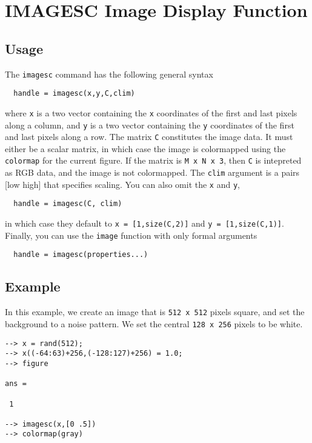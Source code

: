 \section{IMAGESC Image Display Function}

\subsection{Usage}

The \verb|imagesc| command has the following general syntax
\begin{verbatim}
  handle = imagesc(x,y,C,clim)
\end{verbatim}
where \verb|x| is a two vector containing the \verb|x| coordinates
of the first and last pixels along a column, and \verb|y| is a
two vector containing the \verb|y| coordinates of the first and
last pixels along a row.  The matrix \verb|C| constitutes the
image data.  It must either be a scalar matrix, in which case
the image is colormapped using the  \verb|colormap| for the current
figure.  If the matrix is \verb|M x N x 3|, then \verb|C| is intepreted
as RGB data, and the image is not colormapped.  The \verb|clim|
argument is a pairs [low high] that specifies scaling.  You can 
also omit the \verb|x| and \verb|y|, 
\begin{verbatim}
  handle = imagesc(C, clim)
\end{verbatim}
in which case they default to \verb|x = [1,size(C,2)]| and 
\verb|y = [1,size(C,1)]|.  Finally, you can use the \verb|image| function
with only formal arguments
\begin{verbatim}
  handle = imagesc(properties...)
\end{verbatim}

\subsection{Example}

In this example, we create an image that is \verb|512 x 512| pixels
square, and set the background to a noise pattern.  We set the central
\verb|128 x 256| pixels to be white.
\begin{verbatim}
--> x = rand(512);
--> x((-64:63)+256,(-128:127)+256) = 1.0;
--> figure

ans = 

 1 

--> imagesc(x,[0 .5])
--> colormap(gray)
\end{verbatim}

